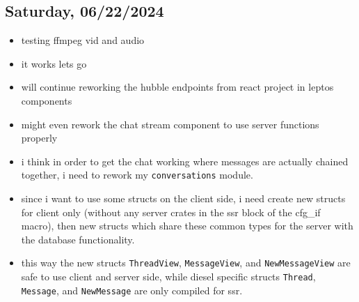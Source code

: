 \subsection*{Saturday, 06/22/2024}
\begin{itemize}
    \item testing ffmpeg vid and audio
    \item it works lets go
    \item will continue reworking the hubble endpoints from react project in
        leptos components
    \item might even rework the chat stream component to use server functions
        properly
    \item i think in order to get the chat working where messages are actually
        chained together, i need to rework my \texttt{conversations} module.
    \item since i want to use some structs on the client side, i need create new
        structs for client only (without any server crates in the ssr block of
        the cfg_if macro), then new structs which share these common types for
        the server with the database functionality.
    \item this way the new structs \texttt{ThreadView}, \texttt{MessageView},
        and \texttt{NewMessageView} are safe to use client and server side,
        while diesel specific structs \texttt{Thread}, \texttt{Message}, and
        \texttt{NewMessage} are only compiled for ssr.
\end{itemize}

